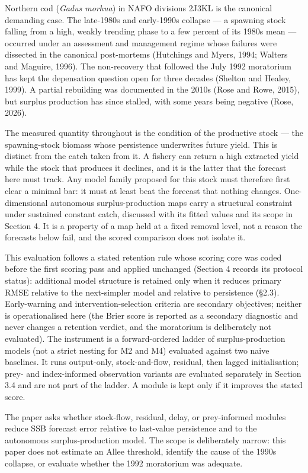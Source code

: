 \documentclass[11pt]{article}
\begin{document}
Northern cod (\emph{Gadus morhua}) in NAFO divisions 2J3KL is the
canonical demanding case. The late-1980s and early-1990s collapse --- a
spawning stock falling from a high, weakly trending phase to a few
percent of its 1980s mean --- occurred under an assessment and
management regime whose failures were dissected in the canonical
post-mortems (Hutchings and Myers, 1994; Walters and Maguire, 1996). The
non-recovery that followed the July 1992 moratorium has kept the
depensation question open for three decades (Shelton and Healey, 1999).
A partial rebuilding was documented in the 2010s (Rose and Rowe, 2015),
but surplus production has since stalled, with some years being negative
(Rose, 2026).

The measured quantity throughout is the condition of the productive
stock --- the spawning-stock biomass whose persistence underwrites
future yield. This is distinct from the catch taken from it. A fishery
can return a high extracted yield while the stock that produces it
declines, and it is the latter that the forecast here must track. Any
model family proposed for this stock must therefore first clear a
minimal bar: it must at least beat the forecast that nothing changes.
One-dimensional autonomous surplus-production maps carry a structural
constraint under sustained constant catch, discussed with its fitted
values and its scope in Section 4. It is a property of a map held at a
fixed removal level, not a reason the forecasts below fail, and the
scored comparison does not isolate it.

This evaluation follows a stated retention rule whose scoring core was
coded before the first scoring pass and applied unchanged (Section 4 records its protocol
status): additional model structure is retained only when it reduces
primary RMSE relative to the next-simpler model and relative to
persistence (\S{}2.3). Early-warning and intervention-selection criteria
are secondary objectives; neither is operationalised here (the
Brier score is reported as a secondary diagnostic and never changes a
retention verdict, and the moratorium is deliberately not evaluated).
The instrument is a forward-ordered ladder of surplus-production models
(not a strict nesting for M2 and M4) evaluated against two naive
baselines. It runs output-only, stock-and-flow, residual, then lagged initialisation;
prey- and index-informed observation variants are evaluated separately
in Section 3.4 and are not part of the ladder. A module is kept only if
it improves the stated score.

The paper asks whether stock-flow, residual, delay, or prey-informed
modules reduce SSB forecast error relative to last-value persistence and
to the autonomous surplus-production model. The scope is deliberately
narrow: this paper does not estimate an Allee threshold, identify the
cause of the 1990s collapse, or evaluate whether the 1992 moratorium was
adequate.
\end{document}
